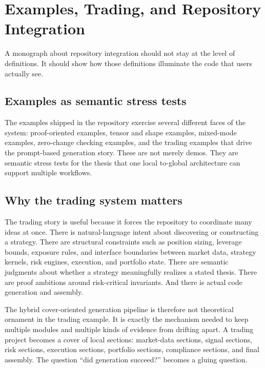 \chapter{Examples, Trading, and Repository Integration}

A monograph about repository integration should not stay at the level of definitions. It
should show how those definitions illuminate the code that users actually see.

\section*{Examples as semantic stress tests}
The examples shipped in the repository exercise several different faces of the system:
proof-oriented examples, tensor and shape examples, mixed-mode examples, zero-change
checking examples, and the trading examples that drive the prompt-based generation story.
These are not merely demos. They are semantic stress tests for the thesis that one local
to-global architecture can support multiple workflows.

\section*{Why the trading system matters}
The trading story is useful because it forces the repository to coordinate many ideas at
once. There is natural-language intent about discovering or constructing a strategy. There
are structural constraints such as position sizing, leverage bounds, exposure rules, and
interface boundaries between market data, strategy kernels, risk engines, execution, and
portfolio state. There are semantic judgments about whether a strategy meaningfully realizes
a stated thesis. There are proof ambitions around risk-critical invariants. And there is
actual code generation and assembly.

The hybrid cover-oriented generation pipeline is therefore not theoretical ornament in the
trading example. It is exactly the mechanism needed to keep multiple modules and multiple
kinds of evidence from drifting apart. A trading project becomes a cover of local sections:
market-data sections, signal sections, risk sections, execution sections, portfolio
sections, compliance sections, and final assembly. The question ``did generation succeed?''
becomes a gluing question.

